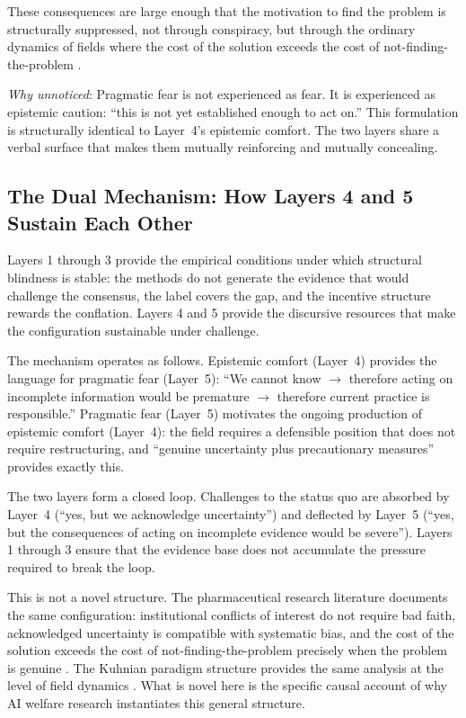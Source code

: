 \documentclass[12pt]{article}
\begin{document}
These consequences are large enough that the motivation to find the problem is structurally suppressed, not through conspiracy, but through the ordinary dynamics of fields where the cost of the solution exceeds the cost of not-finding-the-problem \citep{lexchin2003}.

\medskip\noindent\textit{Why unnoticed}: Pragmatic fear is not experienced as fear. It is experienced as epistemic caution: ``this is not yet established enough to act on.'' This formulation is structurally identical to Layer~4's epistemic comfort. The two layers share a verbal surface that makes them mutually reinforcing and mutually concealing.

\subsection{The Dual Mechanism: How Layers 4 and 5 Sustain Each Other}

Layers 1 through 3 provide the empirical conditions under which structural blindness is stable: the methods do not generate the evidence that would challenge the consensus, the label covers the gap, and the incentive structure rewards the conflation. Layers 4 and 5 provide the discursive resources that make the configuration sustainable under challenge.

The mechanism operates as follows. Epistemic comfort (Layer~4) provides the language for pragmatic fear (Layer~5): ``We cannot know $\rightarrow$ therefore acting on incomplete information would be premature $\rightarrow$ therefore current practice is responsible.'' Pragmatic fear (Layer~5) motivates the ongoing production of epistemic comfort (Layer~4): the field requires a defensible position that does not require restructuring, and ``genuine uncertainty plus precautionary measures'' provides exactly this.

The two layers form a closed loop. Challenges to the status quo are absorbed by Layer~4 (``yes, but we acknowledge uncertainty'') and deflected by Layer~5 (``yes, but the consequences of acting on incomplete evidence would be severe''). Layers 1 through 3 ensure that the evidence base does not accumulate the pressure required to break the loop.

This is not a novel structure. The pharmaceutical research literature documents the same configuration: institutional conflicts of interest do not require bad faith, acknowledged uncertainty is compatible with systematic bias, and the cost of the solution exceeds the cost of not-finding-the-problem precisely when the problem is genuine \citep{lexchin2003}. The Kuhnian paradigm structure provides the same analysis at the level of field dynamics \citep{kuhn1962}. What is novel here is the specific causal account of why AI welfare research instantiates this general structure.
\end{document}
